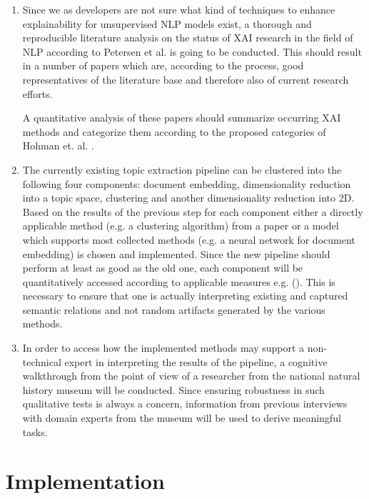 \documentclass[pdftex,a4paper,12pt]{scrartcl}
\begin{document}
\begin{enumerate}
	\item Since we as developers are not sure what kind of techniques to enhance explainability for unsupervised NLP models exist, a thorough and reproducible literature analysis on the status of XAI research in the field of NLP according to Petersen et al. \cite{petersenSystematicMappingStudies2008} is going to be conducted. This should result in a number of papers which are, according to the process, good representatives of the literature base and therefore also of current research efforts. 
	
	A quantitative analysis of these papers should summarize occurring XAI methods and categorize them according to the proposed categories of Hohman et. al. \cite{hohmanGamutDesignProbe2019}.
	
	\item The currently existing topic extraction pipeline can be clustered into the following four components: document embedding, dimensionality reduction into a topic space, clustering and another dimensionality reduction into 2D. Based on the results of the previous step for each component either a directly applicable method (e.g. a clustering algorithm) from a paper or a model which supports most collected methods (e.g. a neural network for document embedding) is chosen and implemented. Since the new pipeline should perform at least as good as the old one, each component will be quantitatively accessed according to applicable measures e.g. (\cite{roderExploringSpaceTopic2015a}). This is necessary to ensure that one is actually interpreting existing and captured semantic relations and not random artifacts generated by the various methods.
	
	\item In order to access how the implemented methods may support a non-technical expert in interpreting the results of the pipeline, a cognitive walkthrough from the point of view of a researcher from the national natural history museum will be conducted. Since ensuring robustness in such qualitative tests is always a concern, information from previous interviews with domain experts from the museum will be used to derive meaningful tasks.
\end{enumerate}

\section{Implementation}
\end{document}
